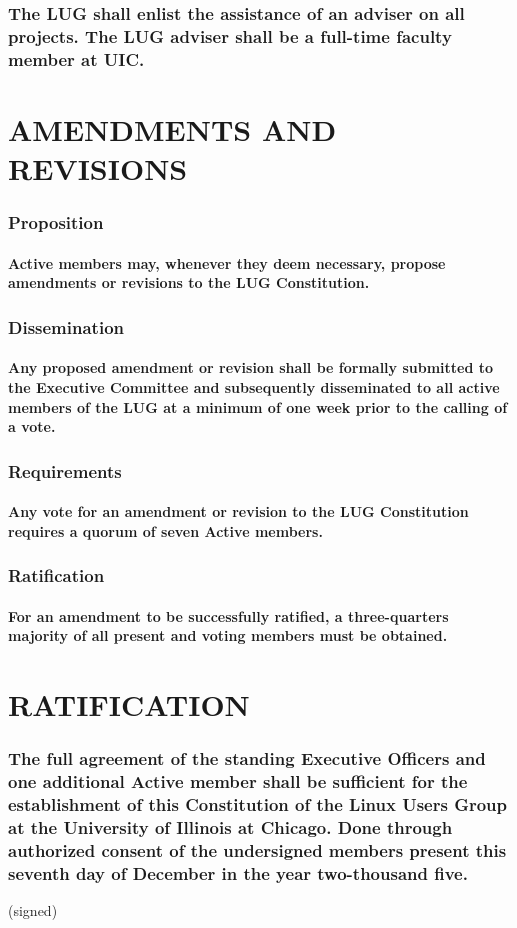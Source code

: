 \documentclass[letter]{report}
\begin{document}
\section{The LUG shall enlist the assistance of an adviser on all projects. The LUG adviser shall be a full-time faculty member at UIC.}

\part{AMENDMENTS AND REVISIONS}
\section{Proposition}
\subsection{Active members may, whenever they deem necessary, propose amendments or revisions to the LUG Constitution.}
\section{Dissemination}
\subsection{Any proposed amendment or revision shall be formally submitted to the Executive Committee and subsequently disseminated to all active members of the LUG at a minimum of one week prior to the calling of a vote.}
\section{Requirements}
\subsection{Any vote for an amendment or revision to the LUG Constitution requires a quorum of seven Active members.}
\section{Ratification}
\subsection{For an amendment to be successfully ratified, a three-quarters majority of all present and voting members must be obtained.}

\part{RATIFICATION}
\section{The full agreement of the standing Executive Officers and one additional Active member shall be sufficient for the establishment of this Constitution of the Linux Users Group at the University of Illinois at Chicago. Done through authorized consent of the undersigned members present this seventh day of December in the year two-thousand five.
}
(signed)
\end{document}

